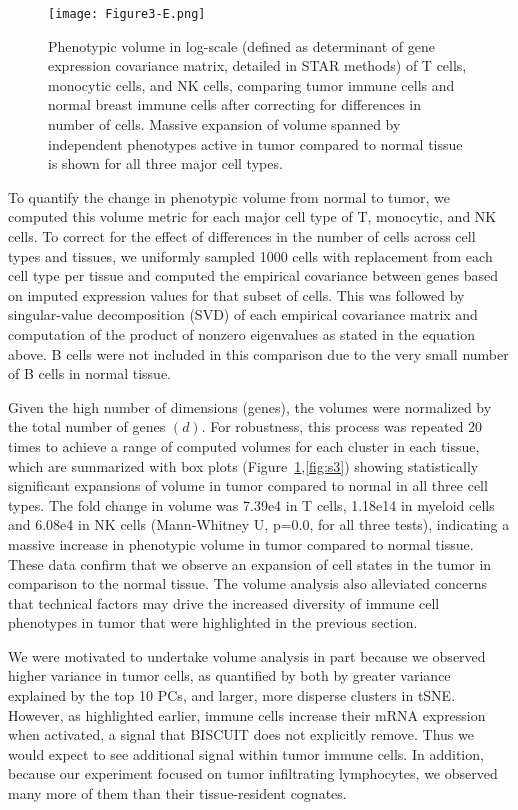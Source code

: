 \begin{figure}
\centering
\texttt{[image: Figure3-E.png]}
\caption{Phenotypic volume in log-scale (defined as determinant of gene expression covariance matrix, detailed in STAR methods) of T cells, monocytic cells, and NK cells, comparing tumor immune cells and normal breast immune cells after correcting for differences in number of cells.
  Massive expansion of volume spanned by independent phenotypes active in tumor compared to normal tissue is shown for all three major cell types.
}
\label{fig:3e}
\end{figure}

To quantify the change in phenotypic volume from normal to tumor, we computed this volume metric for each major cell type of T, monocytic, and NK cells.
To correct for the effect of differences in the number of cells across cell types and tissues, we uniformly sampled 1000 cells with replacement from each cell type per tissue and computed the empirical covariance between genes based on imputed expression values for that subset of cells.
This was followed by singular-value decomposition (SVD) of each empirical covariance matrix and computation of the product of nonzero eigenvalues as stated in the equation above.
B cells were not included in this comparison due to the very small number of B cells in normal tissue.

Given the high number of dimensions (genes), the volumes were normalized by the total number of genes \((d)\). %
For robustness, this process was repeated 20 times to achieve a range of computed volumes for each cluster in each tissue, which are summarized with box plots (Figure~\ref{fig:3e},\ref{fig:s3}) showing statistically significant expansions of volume in tumor compared to normal in all three cell types.
The fold change in volume was 7.39e4 in T cells, 1.18e14 in myeloid cells and 6.08e4 in NK cells (Mann-Whitney U, p=0.0, for all three tests), indicating a massive increase in phenotypic volume in tumor compared to normal tissue.
These data confirm that we observe an expansion of cell states in the tumor in comparison to the normal tissue. 
The volume analysis also alleviated concerns that technical factors may drive the increased diversity of immune cell phenotypes in tumor that were highlighted in the previous section.

We were motivated to undertake volume analysis in part because we observed higher variance in tumor cells, as quantified by both by greater variance explained by the top 10 PCs, and larger, more disperse clusters in tSNE\@.
However, as highlighted earlier, immune cells increase their mRNA expression when activated, a signal that BISCUIT does not explicitly remove. 
Thus we would expect to see additional signal within tumor immune cells.
In addition, because our experiment focused on tumor infiltrating lymphocytes, we observed many more of them than their tissue-resident cognates.

